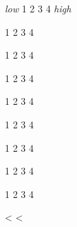 \documentclass[12pt]{article}
\begin{document}
\begin{minipage}[t][.8\textheight]{.30\textwidth}
  \textit{low} \hfill 1 \hfill 2 \hfill 3 \hfill 4 \hfill \textit{high}
  \vfill

  \hspace{3ex} \hfill 1 \hfill 2 \hfill 3 \hfill 4 \hfill \hspace{4ex}
  \vfill

  \hspace{3ex} \hfill 1 \hfill 2 \hfill 3 \hfill 4 \hfill \hspace{4ex}
  \vfill

  \hspace{3ex} \hfill 1 \hfill 2 \hfill 3 \hfill 4 \hfill \hspace{4ex}
  \vfill

  \hspace{3ex} \hfill 1 \hfill 2 \hfill 3 \hfill 4 \hfill \hspace{4ex}
  \vfill

  \hspace{3ex} \hfill 1 \hfill 2 \hfill 3 \hfill 4 \hfill \hspace{4ex}
  \vfill

  \hspace{3ex} \hfill 1 \hfill 2 \hfill 3 \hfill 4 \hfill \hspace{4ex}
  \vfill

  \hspace{3ex} \hfill 1 \hfill 2 \hfill 3 \hfill 4 \hfill \hspace{4ex}
  \vfill

  \hspace{3ex} \hfill 1 \hfill 2 \hfill 3 \hfill 4 \hfill \hspace{4ex}
  \vfill


\end{minipage}%


\newpage %

\thispagestyle{empty}
\noindent
{}%
\newpage %

<%
<%
\end{document}
